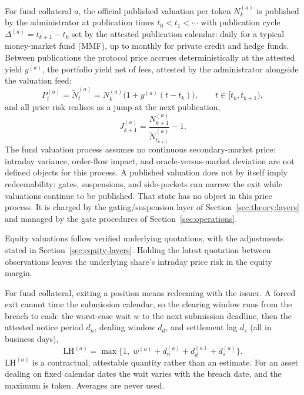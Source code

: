 For fund collateral $a$, the official published valuation per token $N_k^{(a)}$ is published by the administrator at publication times $t_0 < t_1 < \cdots$ with publication cycle $\Delta^{(a)} = t_{k+1}-t_k$ set by the attested publication calendar: daily for a typical money-market fund (MMF), up to monthly for private credit and hedge funds. Between publications the protocol price accrues deterministically at the attested yield $y^{(a)}$, the portfolio yield net of fees, attested by the administrator alongside the valuation feed:
\begin{equation}\label{eq:nav-process}
P_t^{(a)} = \tilde N_t^{(a)} = N_k^{(a)}\bigl(1 + y^{(a)}(t-t_k)\bigr),\qquad t\in[t_k,t_{k+1}),
\end{equation}
and all price risk realises as a jump at the next publication,
\begin{equation}\label{eq:nav-jump}
J_{k+1}^{(a)} = \frac{N_{k+1}^{(a)}}{\tilde N^{(a)}_{t_{k+1}^-}} - 1 .
\end{equation}
The fund valuation process assumes no continuous secondary-market price: intraday variance, order-flow impact, and oracle-versus-market deviation are not defined objects for this process. A published valuation does not by itself imply redeemability: gates, suspensions, and side-pockets can narrow the exit while valuations continue to be published. That state has no object in this price process. It is charged by the gating/suspension layer of Section~\ref{sec:theory:layers} and managed by the gate procedures of Section~\ref{sec:operations}.

Equity valuations follow verified underlying quotations, with the adjustments stated in Section~\ref{sec:equity-layers}. Holding the latest quotation between observations leaves the underlying share's intraday price risk in the equity margin.

For fund collateral, exiting a position means redeeming with the issuer. A forced exit cannot time the submission calendar, so the clearing window runs from the breach to cash: the worst-case wait $w$ to the next submission deadline, then the attested notice period $d_n$, dealing window $d_d$, and settlement lag $d_s$ (all in business days),
\begin{equation}\label{eq:mpor-eff}
\mathrm{LH}^{(a)} = \max\bigl\{1,\; w^{(a)} + d_n^{(a)} + d_d^{(a)} + d_s^{(a)}\bigr\} .
\end{equation}
$\mathrm{LH}^{(a)}$ is a contractual, attestable quantity rather than an estimate. For an asset dealing on fixed calendar dates the wait varies with the breach date, and the maximum is taken. Averages are never used.

